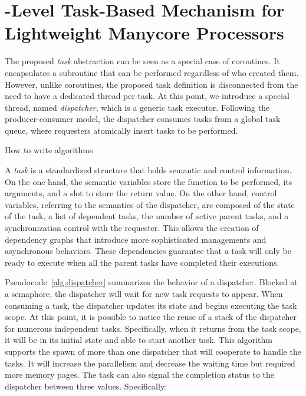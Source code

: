 \section{\os-Level Task-Based Mechanism for Lightweight Manycore Processors}
\label{sec:solution}

	The proposed \textit{task} abstraction can be seen as a special case of
	coroutines.  It encapsulates a subroutine that can be performed regardless
	of who created them. However, unlike coroutines, the proposed task
	definition is disconnected from the need to have a dedicated thread per
	task. At this point, we introduce a special thread, named
	\textit{dispatcher}, which is a generic task executor. Following the
	producer-consumer model, the dispatcher consumes tasks from a global task
	queue, where requesters atomically insert tasks to be performed.

	\begin{algorithm}[b]
		\label{alg:dispatcher}
		\caption{How to write algorithms}
	\end{algorithm}

	A \textit{task} is a standardized structure that holds semantic and control
	information. On the one hand, the semantic variables store the function to
	be performed, its arguments, and a slot to store the return value. On the
	other hand, control variables, referring to the semantics of the
	dispatcher, are composed of the state of the task, a list of dependent
	tasks, the number of active parent tasks, and a synchronization control
	with the requester. This allows the creation of dependency graphs that
	introduce more sophisticated managements and asynchronous behaviors. These
	dependencies guarantee that a task will only be ready to execute when all
	the parent tasks have completed their executions.

	Pseudocode~\ref{alg:dispatcher} summarizes the behavior of a dispatcher.
	Blocked at a semaphore, the dispatcher will wait for new task requests to
	appear. When consuming a task, the dispatcher updates its state and begins
	executing the task scope. At this point, it is possible to notice the reuse
	of a stack of the dispatcher for numerous independent tasks. Specifically,
	when it returns from the task scope, it will be in its initial state and
	able to start another task.	This algorithm supports the spawn of more than one
	dispatcher that will cooperate to handle the tasks. It will increase the
	parallelism and decrease the waiting time but required more memory pages.
	The task can also signal the completion status to the dispatcher between
	three values. Specifically:

